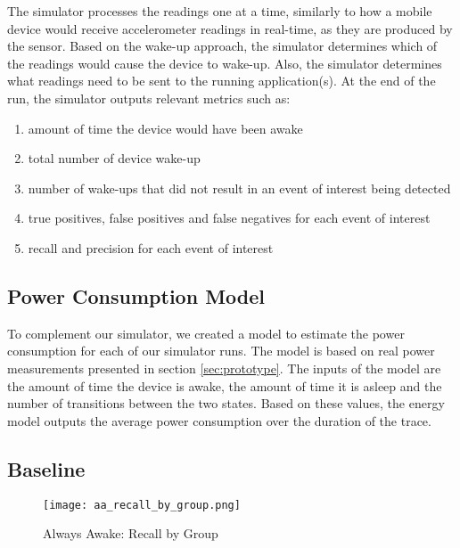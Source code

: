 The simulator processes the readings one at a time, similarly to how a mobile device would receive accelerometer readings in real-time, as they are produced by the sensor. Based on the wake-up approach, the simulator determines which of the readings would cause the device to wake-up. Also, the simulator determines what readings need to be sent to the running application(s). At the end of the run, the simulator outputs relevant metrics such as:

\begin{enumerate}
\setlength{\itemsep}{-3pt}  

\item amount of time the device would have been awake

\item total number of device wake-up

\item number of wake-ups that did not result in an event of interest being detected

\item true positives, false positives and false negatives for each event of interest

\item recall and precision for each event of interest

\end{enumerate}

\subsection{Power Consumption Model}

To complement our simulator, we created a model to estimate the power consumption for each of our simulator runs. The model is based on real power measurements presented in section \ref{sec:prototype}. The inputs of the model are the amount of time the device is awake, the amount of time it is asleep and the number of transitions between the two states. Based on these values, the energy model outputs the average power consumption over the duration of the trace.

\subsection{Baseline}

\begin{figure}[t]
	\texttt{[image: aa\_recall\_by\_group.png]}
	\caption{Always Awake: Recall by Group}
    	\label{fig:aaRecallByGroup}
\end{figure}


